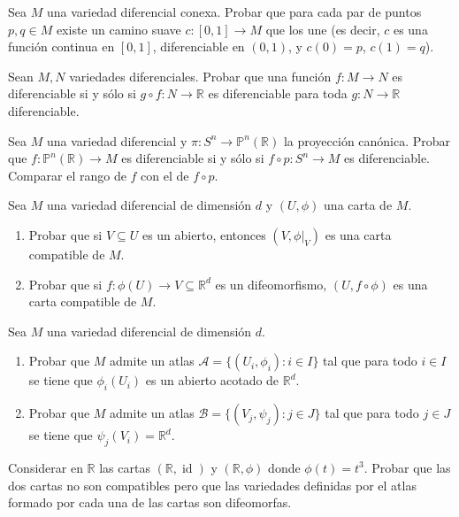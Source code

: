 \documentclass[12pt, a4paper]{amsart}
\theoremstyle{definition}
\newcommand{\RR}{\mathbb{R}}      %
\DeclareMathOperator{\id}{id}
\begin{document}
\begin{question}
Sea $M$ una variedad diferencial conexa. Probar que para cada par de puntos $p,q\in M$ existe un camino suave $c:[0,1]\to M$ que los une (es decir, $c$ es una función continua en $[0,1]$, diferenciable en $(0,1)$, y $c(0)=p$, $c(1)=q$).
\end{question}

\begin{question}
Sean $M,N$ variedades diferenciales. Probar que una función $f:M\to N$ es diferenciable si y sólo si $g\circ f:N\to\RR$ es diferenciable para toda $g:N\to\RR$ diferenciable.
\end{question}

\begin{question}
Sea $M$ una variedad diferencial y $\pi:S^n\to\mathbb{P}^n(\RR)$ la proyección canónica. Probar que $f:\mathbb{P}^n(\RR)\to M$ es diferenciable si y sólo si $f\circ p:S^n\to M$ es diferenciable. Comparar el rango de $f$ con el de $f\circ p$.
\end{question}

\begin{question}
Sea $M$ una variedad diferencial de dimensión $d$ y $(U,\phi)$ una carta de $M$.
\begin{enumerate}[label=\textbf{\alph*.}]
\item Probar que si $V\subseteq U$ es un abierto, entonces $(V,\left.\phi\right|_V)$ es una carta compatible de $M$.
\item Probar que si $f:\phi(U)\to V\subseteq\RR^d$ es un difeomorfismo, $(U,f\circ\phi)$ es una carta compatible de $M$.
\end{enumerate}
\end{question}

\begin{question}
Sea $M$ una variedad diferencial de dimensión $d$.
\begin{enumerate}[label=\textbf{\alph*.}]
\item Probar que $M$ admite un atlas $\mathscr{A}=\{(U_i,\phi_i):i\in I\}$ tal que para todo $i\in I$ se tiene que $\phi_i(U_i)$ es un abierto acotado de $\RR^d$.
\item Probar que $M$ admite un atlas $\mathscr{B}=\{(V_j,\psi_j):j\in J\}$ tal que para todo $j\in J$ se tiene que $\psi_j(V_i)=\RR^d$.
\end{enumerate}
\end{question}

\begin{question}
Considerar en $\RR$ las cartas $(\RR,\id)$ y $(\RR,\phi)$ donde $\phi(t)=t^3$. Probar que las dos cartas no son compatibles pero que las variedades definidas por el atlas formado por cada una de las cartas son difeomorfas.
\end{question}
\end{document}

